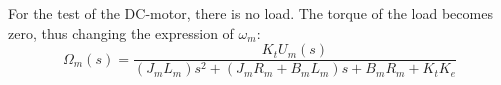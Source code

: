 For the test of the DC-motor, there is no load. The torque of the load becomes zero, thus changing the expression of $\omega_m$: 
\begin{equation}
	\Omega_m(s) = \frac{K_tU_m(s)}{(J_mL_m)s^2 + (J_mR_m + B_mL_m)s + B_mR_m + K_tK_e}
\end{equation}









